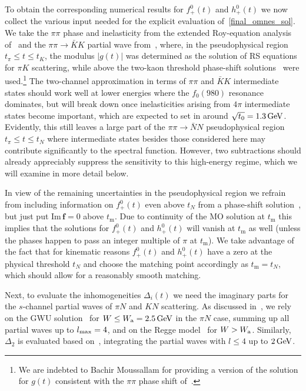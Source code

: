 \documentclass[11pt]{article}%
\newcommand{\tpi}{t_\pi}
\newcommand{\tK}{t_K}
\newcommand{\tN}{t_N}
\newcommand{\tm}{t_\text{m}}
\newcommand{\ff}{\mathbf{f}}
\renewcommand{\Im}{\text{Im}\,}
\begin{document}
To obtain the corresponding numerical results for $f^0_+(t)$ and $h^0_+(t)$ we now collect the various input needed for the explicit evaluation of~\eqref{final_omnes_sol}. We take the $\pi\pi$ phase and inelasticity from the extended Roy-equation analysis of~\cite{CCL:Regge,CCL:PWA} and the $\pi\pi\to\bar K K$ partial wave from~\cite{BDM04}, where, in the pseudophysical region $\tpi\leq t\leq \tK$, the modulus $|g(t)|$ was determined as the solution of RS equations for $\pi K$ scattering, while above the two-kaon threshold phase-shift solutions~\cite{Cohen,Etkin} were used.\footnote{ We are indebted to Bachir Moussallam for providing a version of the solution for $g(t)$ consistent with the $\pi\pi$ phase shift of~\cite{CCL:Regge,CCL:PWA}.} The two-channel approximation in terms of $\pi\pi$ and $\bar K K$ intermediate states should work well at lower energies where the $f_0(980)$ resonance dominates, but will break down once inelasticities arising from $4\pi$ intermediate states become important, which are expected to set in around $\sqrt{t_0}=1.3\,{\rm GeV}$. Evidently, this still leaves a large part of the $\pi\pi\to\bar N N$ pseudophysical region $\tpi\leq t\leq \tN$  where intermediate states besides those considered here may contribute significantly to the spectral function. However, two subtractions should already appreciably suppress the sensitivity to this high-energy regime, which we will examine in more detail below.

In view of the remaining uncertainties in the pseudophysical region we refrain from including information on $f^0_+(t)$ even above $\tN$ from a phase-shift solution~\cite{Anisovich}, but just put $\Im \ff=0$ above $\tm$. Due to continuity of the MO solution at $\tm$ this implies that the solutions for $f^0_+(t)$ and $h^0_+(t)$ will vanish at $\tm$ as well (unless the phases happen to pass an integer multiple of $\pi$ at $\tm$). We take advantage of the fact that for kinematic reasons $f^0_+(t)$ and $h^0_+(t)$ have a zero at the physical threshold $\tN$ and choose the matching point accordingly as $\tm=\tN$, which should allow for a reasonably smooth matching.

Next, to evaluate the inhomogeneities $\Delta_i(t)$ we need the imaginary parts for the $s$-channel partial waves of $\pi N$ and $KN$ scattering. As discussed in~\cite{RS_DHKM}, we rely on the GWU solution~\cite{GWU:2008,SAID} for $W\leq W_{\rm a}=2.5\,{\rm GeV}$ in the $\pi N$ case, summing up all partial waves up to $l_{\rm max}=4$, and on the Regge model~\cite{piNuRegge} for $W>W_{\rm a}$. Similarly, $\Delta_2$ is evaluated based on~\cite{SAID,GWU:KN}, integrating the partial waves with $l\leq4$ up to $2\,{\rm GeV}$. 
\end{document}
